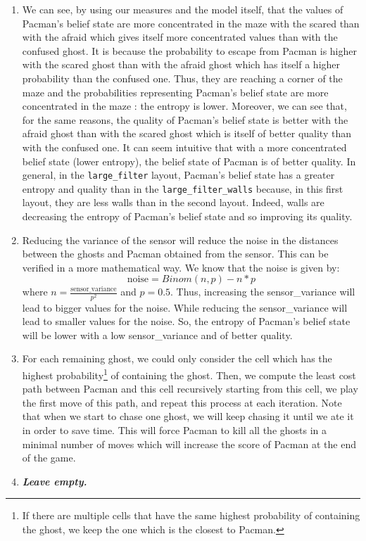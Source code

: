 \documentclass{article}
\begin{document}
\begin{enumerate}[label=\alph*.,leftmargin=*]
    \item We can see, by using our measures and the model itself, that the values of Pacman's belief state are more concentrated in the maze with the scared than with the afraid which gives itself more concentrated values than with the confused ghost. It is because the probability to escape from Pacman is higher with the scared ghost than with the afraid ghost which has itself a higher probability than the confused one. Thus, they are reaching a corner of the maze and the probabilities representing Pacman's belief state are more concentrated in the maze : the entropy is lower.
    Moreover, we can see that, for the same reasons, the quality of Pacman's belief state is better with the afraid ghost than with the scared ghost which is itself of better quality than with the confused one. It can seem intuitive that with a more concentrated belief state (lower entropy), the belief state of Pacman is of better quality. In general, in the \texttt{large\_filter} layout, Pacman's belief state has a greater entropy and quality than in the \texttt{large\_filter\_walls} because, in this first layout, they are less walls than in the second layout. Indeed, walls are decreasing the entropy of Pacman's belief state and so improving its quality.
    
    \item Reducing the variance of the sensor will reduce the noise in the distances between the ghosts and Pacman obtained from the sensor. This can be verified in a more mathematical way. We know that the noise is given by: $$\text{noise} = Binom(n, p) - n * p$$
    where $n = \frac{\text{sensor\_variance}}{p^2}$ and $p = 0.5$. Thus, increasing the sensor\_variance will lead to bigger values for the noise. While reducing the sensor\_variance will lead to smaller values for the noise. So, the entropy of Pacman's belief state will be lower with a low sensor\_variance and of better quality.
    
    \item For each remaining ghost, we could only consider the cell which has the highest probability\footnote{If there are multiple cells that have the same highest probability of containing the ghost, we keep the one which is the closest to Pacman.} of containing the ghost. Then, we compute the least cost path between Pacman and this cell recursively starting from this cell, we play the first move of this path, and repeat this process at each iteration. Note that when we start to chase one ghost, we will keep chasing it until we ate it in order to save time. This will force Pacman to kill all the ghosts in a minimal number of moves which will increase the score of Pacman at the end of the game.
    \item \textbf{\textit{Leave empty.}}
\end{enumerate}

\end{document}
